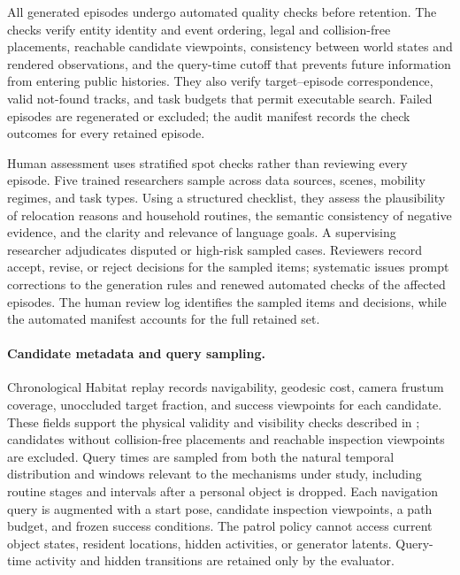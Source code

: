All generated episodes undergo automated quality checks before retention. The
checks verify entity identity and event ordering, legal and collision-free
placements, reachable candidate viewpoints, consistency between world states
and rendered observations, and the query-time cutoff that prevents future
information from entering public histories. They also verify target--episode
correspondence, valid not-found tracks, and task budgets that permit executable
search. Failed episodes are regenerated or excluded; the audit manifest records
the check outcomes for every retained episode.

Human assessment uses stratified spot checks rather than reviewing every
episode. Five trained researchers sample across data sources, scenes, mobility
regimes, and task types. Using a structured checklist, they assess the
plausibility of relocation reasons and household routines, the semantic
consistency of negative evidence, and the clarity and relevance of language
goals. A supervising researcher adjudicates disputed or high-risk sampled
cases. Reviewers record accept, revise, or reject decisions for the sampled
items; systematic issues prompt corrections to the generation rules and
renewed automated checks of the affected episodes. The human review log
identifies the sampled items and decisions, while the automated manifest
accounts for the full retained set.

\paragraph{Candidate metadata and query sampling.}
Chronological Habitat replay records navigability, geodesic cost, camera frustum
coverage, unoccluded target fraction, and success viewpoints for each candidate.
These fields support the physical validity and visibility checks described in
; candidates without collision-free placements and reachable
inspection viewpoints are excluded. Query times are sampled from both the natural temporal
distribution and windows relevant to the mechanisms under study, including routine stages and
intervals after a personal object is dropped. Each navigation query is augmented
with a start pose, candidate inspection viewpoints, a path budget, and frozen
success conditions. The patrol policy cannot access current object states,
resident locations, hidden activities, or generator latents. Query-time activity
and hidden transitions are retained only by the evaluator.

